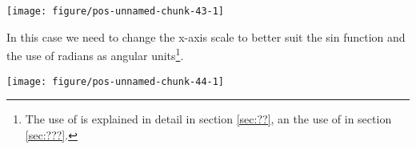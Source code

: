 \documentclass[paper=a4,10pt,div=17,headsepline,BCOR=12mm,twoside,open=right]{scrbook}\usepackage{knitr}
\begin{document}
\begin{knitrout}\footnotesize
{}\color{fgcolor}\begin{kframe}
\begin{alltt}
\hlstd{(}\hlstd{(}\hlstd{=}\hlstd{(}\hlstd{,}  \hlopt{*}  \hlstd{(} \hlopt{+}
  \hlstd{(}
\end{alltt}
\end{kframe}

{\centering \texttt{[image: figure/pos-unnamed-chunk-43-1]} 

}



\end{knitrout}

In this case we need to change the x-axis scale to better suit the sin function and the use of radians as angular units\footnote{The use of  is explained in detail in section \ref{sec:??}, an the use of  in section \ref{sec:???}.}.

\begin{knitrout}\footnotesize
{}\color{fgcolor}\begin{kframe}
\begin{alltt}
\hlstd{(}\hlstd{(}\hlstd{=}\hlstd{(}\hlstd{,}  \hlopt{*}  \hlstd{(} \hlopt{+}
  \hlstd{(} \hlopt{+}
  \hlstd{(}
    \hlstd{=}\hlstd{(}\hlstd{,} \hlstd{,} \hlstd{,} \hlstd{,} \hlstd{)} \hlopt{*} 
    \hlstd{=}\hlstd{(}\hlstd{,} \hlstd{(}\hlopt{~} 
             \hlstd{(}\hlopt{~} \hlstd{(}\hlopt{~} \hlopt{+}
  \hlstd{(}\hlstd{=}\hlstd{)}
\end{alltt}
\end{kframe}

{\centering \texttt{[image: figure/pos-unnamed-chunk-44-1]} 

}



\end{knitrout}
\end{document}
